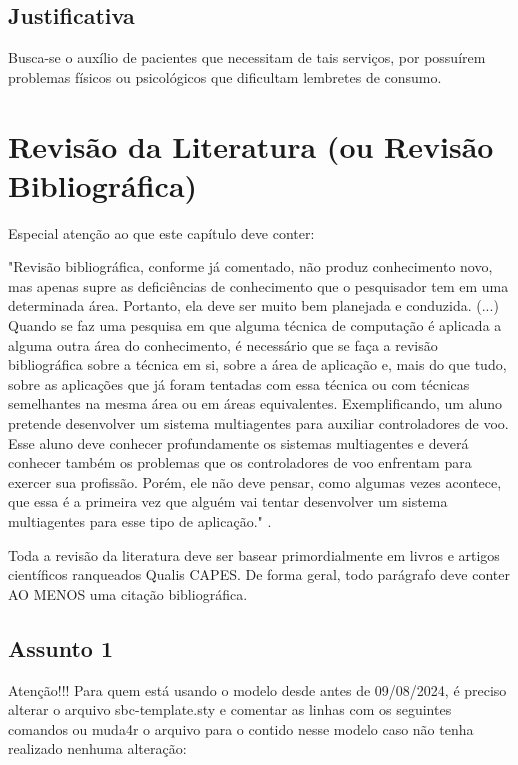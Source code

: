 \documentclass[
	article,			%
	12pt,				%
	oneside,			%
	a4paper,			%
    BIBLATEX,           %
	english,			%
	brazil,				%
	sumario=tradicional
	]{abntex2}
\begin{document}
\subsection{Justificativa}    

Busca-se o auxílio de pacientes que necessitam de tais serviços, por possuírem problemas físicos ou psicológicos que dificultam lembretes de consumo.

\section{Revisão da Literatura (ou Revisão Bibliográfica)}

Especial atenção ao que este capítulo deve conter:
    \begin{citacao}
    "Revisão bibliográfica, conforme já comentado, não produz conhecimento novo, mas apenas supre as
    deficiências de conhecimento que o pesquisador tem em uma determinada área. Portanto, ela deve ser muito
    bem planejada e conduzida.
    (...)
    Quando se faz uma pesquisa em que alguma técnica de computação é aplicada a alguma outra área do
    conhecimento, é necessário que se faça a revisão bibliográfica sobre a técnica em si, sobre a área de aplicação e,
    mais do que tudo, sobre as aplicações que já foram tentadas com essa técnica ou com técnicas semelhantes na
    mesma área ou em áreas equivalentes. Exemplificando, um aluno pretende desenvolver um sistema
    multiagentes para auxiliar controladores de voo. Esse aluno deve conhecer profundamente os sistemas
    multiagentes e deverá conhecer também os problemas que os controladores de voo enfrentam para exercer sua
    profissão. Porém, ele não deve pensar, como algumas vezes acontece, que essa é a primeira vez que alguém vai
    tentar desenvolver um sistema multiagentes para esse tipo de aplicação."
    \cite{PESQUISA:RAUL}.
    \end{citacao}

Toda a revisão da literatura deve ser basear primordialmente em livros e artigos científicos ranqueados Qualis CAPES. De forma geral, todo parágrafo deve conter AO MENOS uma citação bibliográfica.

\subsection{Assunto 1}

Atenção!!! Para quem está usando o modelo desde antes de 09/08/2024, é preciso alterar o arquivo sbc-template.sty e comentar as linhas com os seguintes comandos ou muda4r o arquivo para o contido nesse modelo caso não tenha realizado nenhuma alteração:
\end{document}
